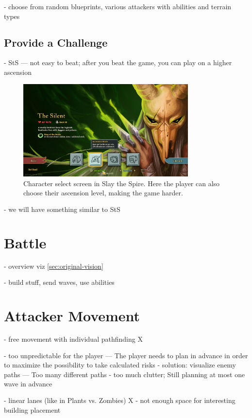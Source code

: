 - choose from random blueprints, various attackers with abilities and terrain types

\subsection{Provide a Challenge}

- StS --- not easy to beat; after you beat the game, you can play on a higher ascension

\begin{figure}
    \centering
    \includegraphics[width=0.8\textwidth]{img/Slay-the-Spire-Ascension.png}
    \caption{Character select screen in Slay the Spire. Here the player can also choose their ascension level, making the game harder.}
    \label{fig:slay-the-spire-ascension}
\end{figure}

- we will have something similar to StS

\section{Battle}

- overview viz \autoref{sec:original-vision}

- build stuff, send waves, use abilities

\section{Attacker Movement}

- free movement with individual pathfinding X

- too unpredictable for the player --- The player needs to plan in advance in order to maximize the possibility to take calculated risks
- solution: visualize enemy paths --- Too many different paths - too much clutter; Still planning at most one wave in advance

- linear lanes (like in Plants vs. Zombies) X
- not enough space for interesting building placement

